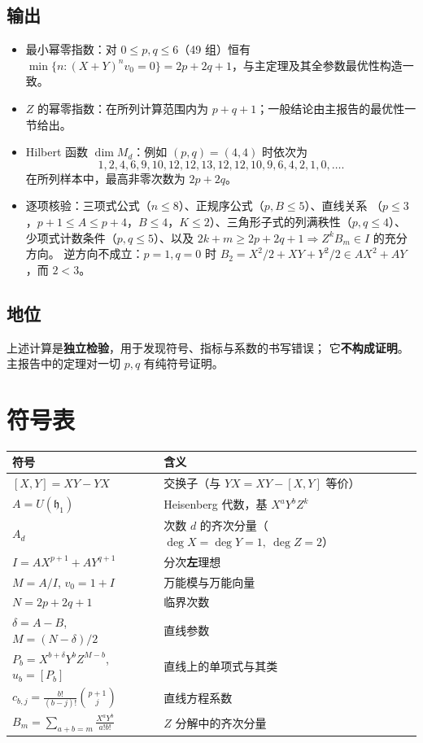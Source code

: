 \documentclass[11pt,UTF8]{ctexart}
\theoremstyle{definition}
\newcommand{\hh}{\mathfrak{h}}
\begin{document}
\subsection{输出}
\begin{itemize}[leftmargin=2em]
\item 最小幂零指数：对 $0\le p,q\le6$（49 组）恒有
$\min\{n:(X+Y)^nv_0=0\}=2p+2q+1$，与主定理及其全参数最优性构造一致。
\item $Z$ 的幂零指数：在所列计算范围内为 $p+q+1$；一般结论由主报告的最优性一节给出。
\item Hilbert 函数 $\dim M_d$：例如 $(p,q)=(4,4)$ 时依次为
\[
1,2,4,6,9,10,12,12,13,12,12,10,9,6,4,2,1,0,\dots.
\]
在所列样本中，最高非零次数为 $2p+2q$。
\item 逐项核验：三项式公式（$n\le8$）、正规序公式（$p,B\le5$）、直线关系
（$p\le3$，$p+1\le A\le p+4$，$B\le4$，$K\le2$）、三角形子式的列满秩性（$p,q\le4$）、
少项式计数条件（$p,q\le5$）、以及 $2k+m\ge2p+2q+1\Rightarrow Z^kB_m\in I$ 的充分方向。
逆方向不成立：$p=1,q=0$ 时 $B_2=X^2/2+XY+Y^2/2\in AX^2+AY$，而 $2<3$。
\end{itemize}

\subsection{地位}
上述计算是\textbf{独立检验}，用于发现符号、指标与系数的书写错误；
它\textbf{不构成证明}。主报告中的定理对一切 $p,q$ 有纯符号证明。

\section{符号表}

\begin{center}
\begin{tabular}{ll}
\toprule
符号 & 含义\\
\midrule
$[X,Y]=XY-YX$ & 交换子（与 $YX=XY-[X,Y]$ 等价）\\
$A=U(\hh_1)$ & Heisenberg 代数，基 $X^aY^bZ^k$\\
$A_d$ & 次数 $d$ 的齐次分量（$\deg X=\deg Y=1,\ \deg Z=2$）\\
$I=AX^{p+1}+AY^{q+1}$ & 分次\textbf{左}理想\\
$M=A/I$, $v_0=1+I$ & 万能模与万能向量\\
$N=2p+2q+1$ & 临界次数\\
$\delta=A-B$, $M=(N-\delta)/2$ & 直线参数\\
$P_b=X^{b+\delta}Y^bZ^{M-b}$, $u_b=[P_b]$ & 直线上的单项式与其类\\
$c_{b,j}=\frac{b!}{(b-j)!}\binom{p+1}{j}$ & 直线方程系数\\
$B_m=\sum_{a+b=m}\frac{X^aY^b}{a!b!}$ & $Z$ 分解中的齐次分量\\
\bottomrule
\end{tabular}
\end{center}
\end{document}
